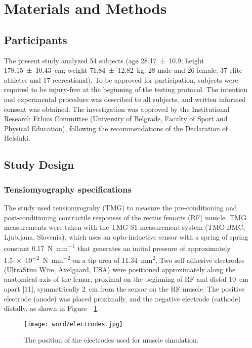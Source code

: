 \documentclass[utf8]{style/FrontiersinHarvard}
\begin{document}
\section{Materials and Methods}
\subsection{Participants}
The present study analyzed 54 subjects (age \SI{28.17 \pm 10.9}{\year}; height \SI{178.15 \pm 10.43}{\centi \meter}; weight \SI{71.84 \pm 12.82}{\kilogram}; 28 male and 26 female; 37 elite athletes and 17 recreational).
To be approved for participation, subjects were required to be injury-free at the beginning of the testing protocol.
The intention and experimental procedure was described to all subjects, and written informed consent was obtained.
The investigation was approved by the Institutional Research Ethics Committee (University of Belgrade, Faculty of Sport and Physical Education), following the recommendations of the Declaration of Helsinki.

\subsection{Study Design}

\subsubsection{Tensiomyography specifications}
The study used tensiomyograhy (TMG) to measure the pre-conditioning and post-conditioning contractile responses of the rectus femoris (RF) muscle.
TMG measurements were taken with the TMG S1 measurement system (TMG-BMC, Ljubljana, Slovenia), which uses an opto-inductive sensor with a spring of spring constant \SI{0.17}{\newton \per \milli \meter} that generates an initial pressure of approximately \SI{1.5e-2}{\newton \per \milli \meter \squared} on a tip area of \SI{11.34}{\milli \meter \squared}.
Two self-adhesive electrodes (UltraStim\textregistered{} Wire, Axelgaard, USA) were positioned approximately along the anatomical axis of the femur, proximal on the beginning of RF and distal \SI{10}{\centi \meter} apart [11], symmetrically \SI{2}{\centi \meter} from the sensor on the RF muscle.
The positive electrode (anode) was placed proximally, and the negative electrode (cathode) distally, as shown in Figure~~\ref{fig:electrodes}.

\begin{figure}[htb!]
	\centering
    \texttt{[image: word/electrodes.jpg]}
    \caption{The position of the electrodes used for muscle simulation.}
    \label{fig:electrodes}
\end{figure}
\end{document}
